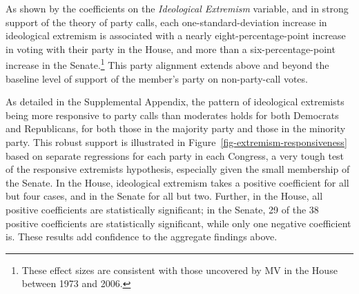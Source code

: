 \documentclass[12pt]{article}
\begin{document}
As shown by the coefficients on the \textit{Ideological Extremism} variable, and in strong support of the theory of party calls, each one-standard-deviation increase in ideological extremism is associated with a nearly eight-percentage-point increase in voting with their party in the House, and more than a six-percentage-point increase in the Senate.\footnote{\doublespacing\normalsize These effect sizes are consistent with those uncovered by MV in the House between 1973 and 2006.} This party alignment extends above and beyond the baseline level of support of the member's party on non-party-call votes.

As detailed in the Supplemental Appendix, the pattern of ideological extremists being more responsive to party calls than moderates holds for both Democrats and Republicans, for both those in the majority party and those in the minority party. This robust support is illustrated in Figure~\ref{fig-extremism-responsiveness} based on separate regressions for each party in each Congress, a very tough test of the responsive extremists hypothesis, especially given the small membership of the Senate. In the House, ideological extremism takes a positive coefficient for all but four cases, and in the Senate for all but two. Further, in the House, all positive coefficients are statistically significant; in the Senate, 29 of the 38 positive coefficients are statistically significant, while only one negative coefficient is. These results add confidence to the aggregate findings above.
\end{document}
